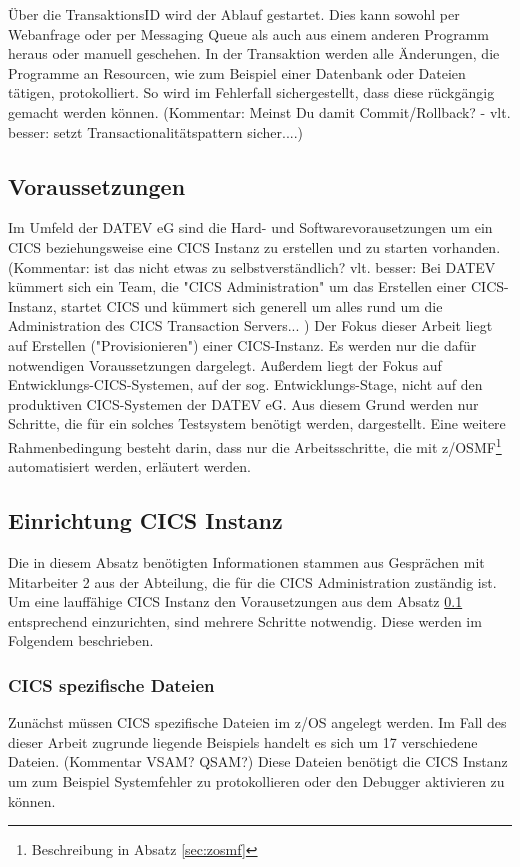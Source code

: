 Über die TransaktionsID wird der Ablauf gestartet.
Dies kann sowohl per Webanfrage oder per Messaging Queue als auch aus einem anderen Programm heraus oder manuell geschehen.
In der Transaktion werden alle Änderungen, die Programme an Resourcen, wie zum Beispiel einer Datenbank oder Dateien tätigen, protokolliert.
So wird im Fehlerfall sichergestellt, dass diese rückgängig gemacht werden können. (Kommentar: Meinst Du damit Commit/Rollback? - vlt. besser: setzt Transactionalitätspattern sicher....)
 \cite{Rayns.2011}

\subsection{Voraussetzungen}\label{subsec:voraus}
Im Umfeld der DATEV eG sind  die Hard- und Softwarevorausetzungen um ein CICS beziehungsweise eine CICS Instanz zu erstellen und zu starten vorhanden. (Kommentar: ist das nicht etwas zu selbstverständlich? vlt. besser: Bei DATEV kümmert sich ein Team, die "CICS Administration" um das Erstellen einer CICS-Instanz, startet CICS und kümmert sich generell um alles rund um die Administration des CICS Transaction Servers... )
Der Fokus dieser Arbeit liegt auf Erstellen ("Provisionieren") einer CICS-Instanz. Es werden nur die dafür notwendigen Voraussetzungen dargelegt.
Außerdem liegt der Fokus auf Entwicklungs-CICS-Systemen, auf der sog. Entwicklungs-Stage, nicht auf den produktiven CICS-Systemen der DATEV eG. 
Aus diesem Grund werden nur Schritte, die für ein solches Testsystem benötigt werden, dargestellt.
Eine weitere Rahmenbedingung besteht darin, dass nur die Arbeitsschritte, die mit z/OSMF\footnote{Beschreibung in Absatz \ref{sec:zosmf}} automatisiert werden, erläutert werden.

\subsection{Einrichtung CICS Instanz}\label{subsec:createCICS}
Die in diesem Absatz benötigten Informationen stammen aus Gesprächen mit Mitarbeiter 2 aus der Abteilung, die für die CICS Administration zuständig ist.
Um eine lauffähige CICS Instanz den Vorausetzungen aus dem Absatz \ref{subsec:voraus} entsprechend einzurichten, sind mehrere Schritte notwendig.
Diese werden im Folgendem beschrieben.

\subsubsection{CICS spezifische Dateien}\label{sssec:speziDat}
Zunächst müssen CICS spezifische Dateien im z/OS angelegt werden.
Im Fall des dieser Arbeit zugrunde liegende Beispiels handelt es sich um 17 verschiedene Dateien. (Kommentar VSAM? QSAM?)
Diese Dateien benötigt die CICS Instanz um zum Beispiel Systemfehler zu protokollieren oder den Debugger aktivieren zu können.


